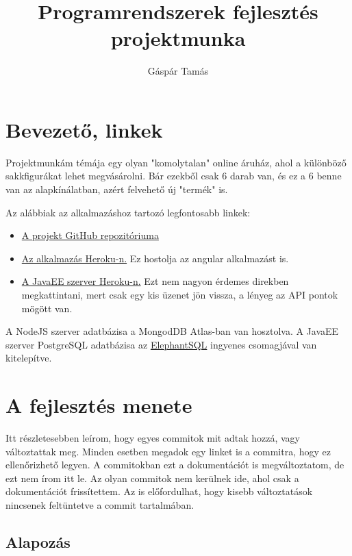 \documentclass[]{article}
\title{Programrendszerek fejlesztés projektmunka}
\author{Gáspár Tamás}
\begin{document}
\maketitle

\tableofcontents

\section{Bevezető, linkek}

Projektmunkám témája egy olyan "komolytalan" online áruház, ahol a különböző sakkfigurákat lehet megvásárolni. Bár ezekből 
csak 6 darab van, és ez a 6 benne van az alapkínálatban, azért felvehető új "termék" is.

Az alábbiak az alkalmazáshoz tartozó legfontosabb linkek:

\begin{itemize}
	\item \href{https://github.com/Gtomika/prf-project}{A projekt GitHub repozitóriuma}
	\item \href{https://prf-project-gaspar.herokuapp.com}{Az alkalmazás Heroku-n.} Ez hostolja az angular alkalmazást is.
	\item \href{https://prf-project-gaspar-javaee.herokuapp.com}{A JavaEE szerver Heroku-n.} Ezt nem nagyon érdemes direkben megkattintani, mert csak egy kis üzenet jön vissza, a lényeg az API pontok mögött van.
\end{itemize}

A NodeJS szerver adatbázisa a MongodDB Atlas-ban van hosztolva. A JavaEE szerver PostgreSQL adatbázisa az \href{https://www.elephantsql.com/}{ElephantSQL} ingyenes csomagjával van kitelepítve.

\section{A fejlesztés menete}

Itt részletesebben leírom, hogy egyes commitok mit adtak hozzá, vagy változtattak meg. Minden esetben megadok egy linket is a 
commitra, hogy ez ellenőrizhető legyen. A commitokban ezt a dokumentációt is megváltoztatom, de ezt nem írom itt le. Az olyan commitok nem kerülnek ide, ahol csak a dokumentációt frissítettem. Az is előfordulhat, hogy kisebb változtatások nincsenek feltüntetve a commit tartalmában.

\subsection{Alapozás}
\end{document}

